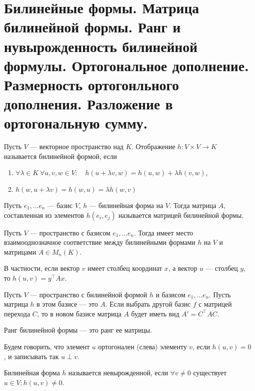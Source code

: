 \section{Билинейные формы. Матрица билинейной формы. Ранг и нувырожденность билинейной формулы. Ортогональное дополнение. Размерность ортогонльного дополнения. Разложение в ортогональную сумму.}
\begin{defn}
    Пусть $ V$ ---  векторное пространство над $ K$. Отображение $ h\colon V \times V \to  K$ называется  {\sf билинейной формой}, если
    \begin{enumerate}[noitemsep]
	\item $ \forall \lambda \in K~ \forall u,v, w \in V\colon \quad h(u+ \lambda v, w) = h(u, w) + \lambda h(v, w)$,
	\item $ h(w, u+ \lambda v) = h(w, u) = \lambda h(w, v)$
    \end{enumerate}
\end{defn}
\begin{defn}
    Пусть $ e_1, \ldots e_n $ --- базис $ V$,  $ h$ --- билинейная форма на $ V$. Тогда матрица  $ A$, составленная из элементов  $ h(e_i, e_j) $ называется  {\sf матрицей билинейной формы}.  
\end{defn}
\begin{lm}
    Пусть $ V$ ---  пространство с базисом $ e_1, \ldots e_n$. Тогда имеет место взаимооднозначное соответствие между билинейными формами $ h$ на  $ V$ и матрицами $ A \in M_n(K)$. 

    В частности, если вектор $ v$ имеет столбец координат  $ x$, а вектор  $ u$ --- столбец  $ y$, то  $ h(u, v ) = y^{\top}A x$.
\end{lm}
\begin{lm}
    Пусть $ V$ --- пространство с билинейной формой  $ h$ и базисом  $ e_1, \ldots e_n$.  Пусть матрица $ h$ в этом базисе --- это $ A$. Если выбрать другой базис $ f$ с матрицей  перехода $ C$, то в новом базисе матрица  $ A$ будет иметь вид  $ A' = C^{\top}AC$.
\end{lm}
\begin{defn}[Ранг]
    {\sf Ранг билинейной формы} --- это ранг ее матрицы. 
\end{defn}
\begin{defn}
    Будем говорить, что элемент $ u$  {\sf ортогонален (слева)} элементу $ v$, если  $ h(u, v) = 0$, и записывать так  $ u \perp v$. 
\end{defn}
\begin{defn}[Невырожденность]
    Билинейная форма $ h$ называется  {\sf невырожденной}, если $ \forall v \ne 0$ существует $ u \in V\colon h( u, v ) \ne  0$.  
\end{defn}
